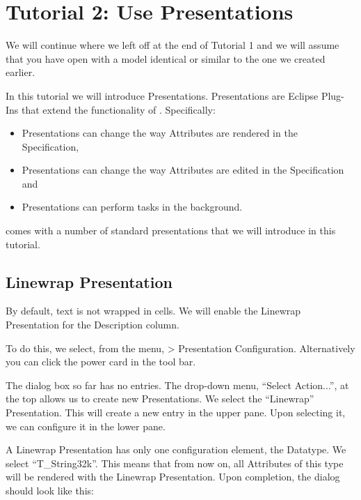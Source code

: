 \section{Tutorial 2: Use Presentations}

We will continue where we left off at the end of Tutorial 1 and we will assume that you have \pror{} open with a model identical or similar to the one we created earlier.

In this tutorial we will introduce Presentations.  Presentations are Eclipse Plug-Ins that extend the functionality of \pror{}.  Specifically:

\begin{itemize}
\item
  Presentations can change the way Attributes are rendered in the Specification,
\item
  Presentations can change the way Attributes are edited in the Specification and
\item
  Presentations can perform tasks in the background.
\end{itemize}

\pror{} comes with a number of standard presentations that we will introduce in this tutorial.

\subsection{Linewrap Presentation}

By default, text is not wrapped in cells.  We will enable the Linewrap Presentation for the Description column.

To do this, we select, from the menu,  \pror{} \textgreater{} Presentation Configuration.  Alternatively you can click the power card in the tool bar.

The dialog box so far has no entries.  The drop-down menu, ``Select Action...'', at the top allows us to create new Presentations.  We select the ``Linewrap'' Presentation.  This will create a new entry in the upper pane.  Upon selecting it, we can configure it in the lower pane.

A Linewrap Presentation has only one configuration element, the Datatype.  We select ``T\_String32k''.  This means that from now on, all Attributes of this type will be rendered with the Linewrap Presentation.  Upon completion, the dialog should look like this:


